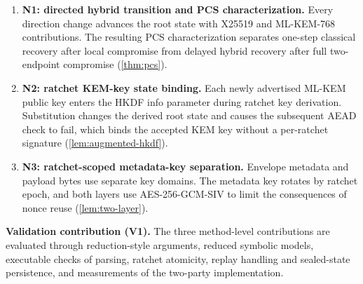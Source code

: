 \documentclass[preprint,12pt]{elsarticle}
\theoremstyle{definition}
\begin{document}
\begin{enumerate}
  \item \textbf{N1: directed hybrid transition and PCS characterization.} Every direction change advances the root state with X25519 and ML-KEM-768 contributions. The resulting PCS characterization separates one-step classical recovery after local compromise from delayed hybrid recovery after full two-endpoint compromise (\cref{thm:pcs}).

  \item \textbf{N2: ratchet KEM-key state binding.} Each newly advertised ML-KEM public key enters the HKDF info parameter during ratchet key derivation. Substitution changes the derived root state and causes the subsequent AEAD check to fail, which binds the accepted KEM key without a per-ratchet signature (\cref{lem:augmented-hkdf}).

  \item \textbf{N3: ratchet-scoped metadata-key separation.} Envelope metadata and payload bytes use separate key domains. The metadata key rotates by ratchet epoch, and both layers use AES-256-GCM-SIV to limit the consequences of nonce reuse (\cref{lem:two-layer}).
\end{enumerate}

\noindent\textbf{Validation contribution (V1).} The three method-level
contributions are evaluated through reduction-style arguments, reduced symbolic
models, executable checks of parsing, ratchet atomicity, replay handling and
sealed-state persistence, and measurements of the two-party implementation.
\end{document}

